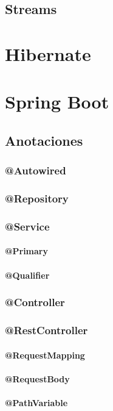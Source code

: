 \documentclass[12pt,article,oneside]{memoir}
\begin{document}
		\section{Streams}
		\newpage
	
	\chapter{Hibernate}
	\newpage

	\chapter{Spring Boot}
		\section{Anotaciones}
			\subsection{@Autowired}
			\subsection{@Repository}
			\subsection{@Service}
				\subsubsection{@Primary}
				\subsubsection{@Qualifier}
			\subsection{@Controller}
			\subsection{@RestController}
				\subsubsection{@RequestMapping}
				\subsubsection{@RequestBody}
				\subsubsection{@PathVariable}
\end{document}
